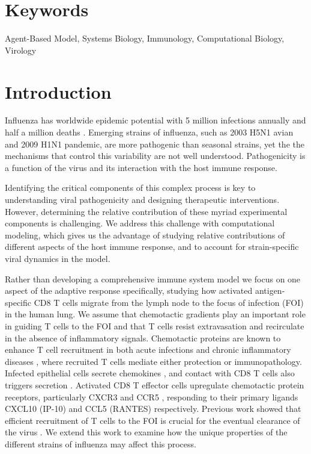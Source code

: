 \documentclass[10pt]{article}
\begin{document}

\section*{Keywords}

Agent-Based Model, Systems Biology, Immunology, Computational Biology, Virology


\section*{Introduction}

Influenza has worldwide epidemic potential with 5 million infections annually and half a million deaths \cite{Who2009}.  Emerging strains of influenza, such as 2003 H5N1 avian and 2009 H1N1 pandemic, are more pathogenic than seasonal strains, yet the the mechanisms that control this variability are not well understood.  Pathogenicity is a function of the virus and its interaction with the host immune response.

Identifying the critical components of this complex process is key to understanding viral pathogenicity and designing therapeutic interventions.  However, determining the relative contribution of these myriad experimental components is challenging. We address this challenge with computational modeling, which gives us the advantage of studying relative contributions of different aspects of the host immune response, and to account for strain-specific viral dynamics in the model.

Rather than developing a comprehensive immune system model we focus on one aspect of the adaptive response specifically, studying how activated antigen-specific CD8 T cells migrate from the lymph node to the focus of infection (FOI) in the human lung.  We assume that chemotactic gradients play an important role in guiding T cells to the FOI and that T cells resist extravasation and recirculate in the absence of inflammatory signals.  Chemotactic proteins are known to enhance T cell recruitment in both acute infections and chronic inflammatory diseases \cite{Bromley2008, Medoff2005, Castellino2006 ,Gunn1998, Okada2005}, where recruited T cells mediate either protection or immunopathology.  Infected epithelial cells secrete chemokines \cite{Chan2005}, and contact with CD8 T cells also triggers secretion \cite{Zhao2000}. Activated CD8 T effector cells upregulate chemotactic protein receptors, particularly CXCR3 and CCR5 \cite{Hoji2005, Groom2011a}, responding to their primary ligands CXCL10 (IP-10) and CCL5 (RANTES) respectively.  Previous work showed that efficient recruitment of T cells to the FOI is crucial for the eventual clearance of the virus \cite{Cerwenka1999, Kim2011}.  We extend this work to examine how the unique properties of the different strains of influenza may affect this process.
\end{document}
